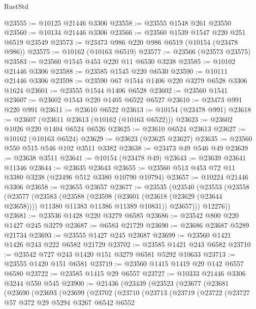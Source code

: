 \begin{lexlean}{RustStd}
\begin{coremodule}
@23555 := @10125 @21446 @3306
@23558 := @23555 @1548 @261 @23550
@23560 := @10134 @21446 @3306
@23566 := @23560 @1539 @1547 @220 @251 @6519 @23549
@23573 := @23473 @986 @220 @986 @6519 (@10154 (@23478 @986))
@23575 := @10162 (@10163 @6519)
@23577 := @23566 (@23573 @23575)
@23583 := @23560 @1545 @453 @220 @11 @6530 @3238
@23585 := @10102 @21446 @3306
@23588 := @23585 @1545 @220 @6530
@23590 := @10111 @21446 @3306
@23598 := @23590 @67 @1544 @1406 @220 @3279 @6528 @3306 @1624
@23601 := @23555 @1544 @1406 @6528
@23602 := @23560 @1541
@23607 := @23602 @1543 @220 @1405 @6522 @6527
@23610 := @23473 @991 @220 @991
@23611 := @23610 @6522
@23613 := @10154 (@23478 @991)
@23618 := @23607 (@23611 @23613 (@10162 (@10163 @6522)))
@23623 := @23602 @1026 @220 @1404 @6524 @6526
@23625 := @23610 @6524 @23613
@23627 := @10162 (@10163 @6524)
@23629 := @23623 (@23625 @23627)
@23635 := @23560 @550 @515 @546 @102 @3511 @3382
@23638 := @23473 @49 @546 @49
@23639 := @23638 @3511
@23641 := @10154 (@23478 @49)
@23643 := @23639 @23641 @11346
@23644 := @23635 @23643
@23655 := @23560 @513 @453 @72 @11 @3380 @3238 (@23496 @512 @3380 @10790 @10794)
@23657 := @10224 @21446 @3306
@23658 := @23655 @23657
@23677 := @23535
    (@23540
      (@23553
        (@23558
          (@23577
            (@23583
              (@23588
                (@23598
                  (@23601 (@23618 (@23629 (@23644 @23658))))
                  @11380
                  @11383
                  @11386
                  @11389
                  @10831))
              @23657)))
        @12276))
@23681 := @23536 @1428 @220 @3279 @6585
@23686 := @23542 @800 @220 @1427 @245 @3279
@23687 := @6583 @21729
@23690 := @23686 @23687 @5289 @21734
@23693 := @23555 @1427 @245 @23687
@23699 := @23560 @1421 @1426 @243 @222 @6582 @21729
@23702 := @23585 @1421 @243 @6582
@23710 := @23542 @727 @243 @1420 @151 @3279 @6581 @5292 @10633
@23713 := @23555 @1420 @151 @6581
@23719 := @23560 @1415 @1419 @29 @142 @6557 @6580
@23722 := @23585 @1415 @29 @6557
@23727 := @10333 @21446 @3306 @3244 @550 @545
@23900 := @21436
    (@23439
      (@23523
        (@23677
          (@23681
            (@23690
              (@23693
                (@23699
                  (@23702
                    (@23710
                      (@23713
                        (@23719
                          (@23722
                            (@23727
                              @57
                              @372
                              @29
                              @5294
                              @3267
                              @6542
                              @6552

\end{coremodule}
\end{lexlean}
